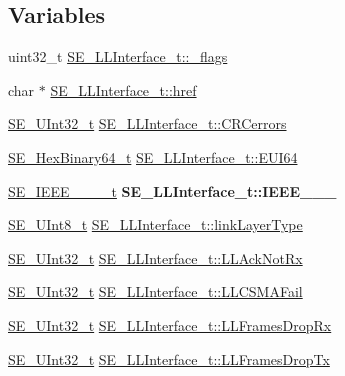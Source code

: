 \subsection*{Variables}
\begin{DoxyCompactItemize}
\item 
uint32\+\_\+t \hyperlink{group__LLInterface_gaa0dc55efd407aa5396ed13e3a59692a7}{S\+E\+\_\+\+L\+L\+Interface\+\_\+t\+::\+\_\+flags}
\item 
char $\ast$ \hyperlink{group__LLInterface_ga1215360f15eba876078292b78bee513a}{S\+E\+\_\+\+L\+L\+Interface\+\_\+t\+::href}
\item 
\hyperlink{group__UInt32_ga70bd4ecda3c0c85d20779d685a270cdb}{S\+E\+\_\+\+U\+Int32\+\_\+t} \hyperlink{group__LLInterface_gae30861c0bcee76e4fb3d6595c0627ee4}{S\+E\+\_\+\+L\+L\+Interface\+\_\+t\+::\+C\+R\+Cerrors}
\item 
\hyperlink{group__HexBinary64_ga718baff6d79d03afcdd37d53265c4684}{S\+E\+\_\+\+Hex\+Binary64\+\_\+t} \hyperlink{group__LLInterface_ga04a90ef4163eeb75c14b51dc355c230b}{S\+E\+\_\+\+L\+L\+Interface\+\_\+t\+::\+E\+U\+I64}
\item 
\mbox{\label{group__LLInterface_ga43f5d176625b2f921d7699543d3040f1}} 
\hyperlink{structSE__IEEE__802__15__4__t}{S\+E\+\_\+\+I\+E\+E\+E\+\_\+\_\+\_\+\_\+t} {\bfseries S\+E\+\_\+\+L\+L\+Interface\+\_\+t\+::\+I\+E\+E\+E\+\_\+\_\+\_}
\item 
\hyperlink{group__UInt8_gaf7c365a1acfe204e3a67c16ed44572f5}{S\+E\+\_\+\+U\+Int8\+\_\+t} \hyperlink{group__LLInterface_ga8ef715e1733f7b500277f889214fc442}{S\+E\+\_\+\+L\+L\+Interface\+\_\+t\+::link\+Layer\+Type}
\item 
\hyperlink{group__UInt32_ga70bd4ecda3c0c85d20779d685a270cdb}{S\+E\+\_\+\+U\+Int32\+\_\+t} \hyperlink{group__LLInterface_ga55320632c0236c217127525559c57b8b}{S\+E\+\_\+\+L\+L\+Interface\+\_\+t\+::\+L\+L\+Ack\+Not\+Rx}
\item 
\hyperlink{group__UInt32_ga70bd4ecda3c0c85d20779d685a270cdb}{S\+E\+\_\+\+U\+Int32\+\_\+t} \hyperlink{group__LLInterface_gabf6b980a7cdfc4791c5d1454186ccd97}{S\+E\+\_\+\+L\+L\+Interface\+\_\+t\+::\+L\+L\+C\+S\+M\+A\+Fail}
\item 
\hyperlink{group__UInt32_ga70bd4ecda3c0c85d20779d685a270cdb}{S\+E\+\_\+\+U\+Int32\+\_\+t} \hyperlink{group__LLInterface_ga35a45921948c27fb0592c48d649eeeff}{S\+E\+\_\+\+L\+L\+Interface\+\_\+t\+::\+L\+L\+Frames\+Drop\+Rx}
\item 
\hyperlink{group__UInt32_ga70bd4ecda3c0c85d20779d685a270cdb}{S\+E\+\_\+\+U\+Int32\+\_\+t} \hyperlink{group__LLInterface_ga0bf6d4a7c6b0fcc3abf05c0f6fe0d9a2}{S\+E\+\_\+\+L\+L\+Interface\+\_\+t\+::\+L\+L\+Frames\+Drop\+Tx}

\end{DoxyCompactItemize}
